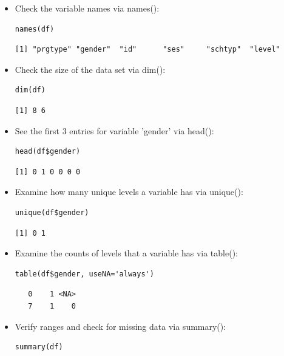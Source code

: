 \begin{frame}
\begin{itemize}
\newpage
		\item Check the variable names via \ttfamily names(): \normalfont 
\begin{lstlisting}
names(df)
\end{lstlisting}

{ \footnotesize
	\begin{verbatim}
[1] "prgtype" "gender"  "id"      "ses"     "schtyp"  "level"
	\end{verbatim}
}	
		\item Check the size of the data set via \ttfamily dim(): \normalfont 
\begin{lstlisting}
dim(df)
\end{lstlisting}

\begin{verbatim}
[1] 8 6
\end{verbatim}	
		\item See the first 3 entries for variable 'gender' via \ttfamily head(): \normalfont 
\begin{lstlisting}
head(df$gender)
\end{lstlisting}

\begin{verbatim}
[1] 0 1 0 0 0 0
\end{verbatim}	

\newpage
	\item Examine how many unique levels a variable has via \ttfamily unique(): \normalfont
\begin{lstlisting}
unique(df$gender)
\end{lstlisting}

\begin{verbatim}
[1] 0 1
\end{verbatim}	
	\item Examine the counts of levels that a variable has via \ttfamily table(): \normalfont
\begin{lstlisting}
table(df$gender, useNA='always')
\end{lstlisting}

\begin{verbatim}
   0    1 <NA> 
   7    1    0 
\end{verbatim}	

\newpage
		\item Verify ranges and check for missing data via \ttfamily summary(): \normalfont 
\begin{lstlisting}
summary(df)
\end{lstlisting}


\end{itemize}
\end{frame}
